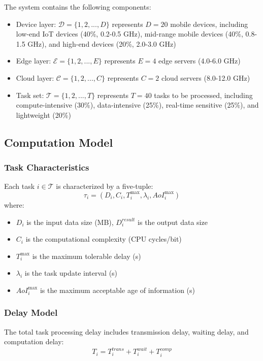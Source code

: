 \documentclass[conference]{IEEEtran}
\begin{document}
The system contains the following components:
\begin{itemize}
    \item Device layer: $\mathcal{D} = \{1, 2, ..., D\}$ represents $D = 20$ mobile devices, including low-end IoT devices (40\%, 0.2-0.5 GHz), mid-range mobile devices (40\%, 0.8-1.5 GHz), and high-end devices (20\%, 2.0-3.0 GHz)
    \item Edge layer: $\mathcal{E} = \{1, 2, ..., E\}$ represents $E = 4$ edge servers (4.0-6.0 GHz)
    \item Cloud layer: $\mathcal{C} = \{1, 2, ..., C\}$ represents $C = 2$ cloud servers (8.0-12.0 GHz)
    \item Task set: $\mathcal{T} = \{1, 2, ..., T\}$ represents $T = 40$ tasks to be processed, including compute-intensive (30\%), data-intensive (25\%), real-time sensitive (25\%), and lightweight (20\%)
\end{itemize}

\subsection{Computation Model}
\subsubsection{Task Characteristics}
Each task $i \in \mathcal{T}$ is characterized by a five-tuple:
\begin{equation}
\tau_i = (D_i, C_i, T_i^{\max}, \lambda_i, AoI_i^{\max})
\end{equation}
where:
\begin{itemize}
    \item $D_i$ is the input data size (MB), $D_i^{result}$ is the output data size
    \item $C_i$ is the computational complexity (CPU cycles/bit)
    \item $T_i^{\max}$ is the maximum tolerable delay (s)
    \item $\lambda_i$ is the task update interval (s)
    \item $AoI_i^{\max}$ is the maximum acceptable age of information (s)
\end{itemize}

\subsubsection{Delay Model}
The total task processing delay includes transmission delay, waiting delay, and computation delay:
\begin{equation}
T_i = T_i^{trans} + T_i^{wait} + T_i^{comp}
\end{equation}
\end{document}
